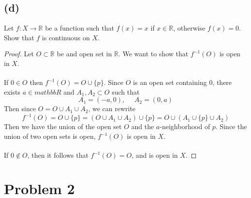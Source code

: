 \documentclass{article}
\begin{document}
\subsection*{(d)}
Let $f: X \rightarrow \mathbb{R}$ be a function such that $f(x) = x$ if $x \in \mathbb{R}$, otherwise $f(x) = 0$.
Show that $f$ is continuous on $X$.
\begin{proof}
    Let $O \subset \mathbb{R}$ be and open set in $\mathbb{R}$.
    We want to show that $f^{-1}(O)$ is open in $X$.
    \\\\
     If $0 \in O$ then $f^{-1}(O) = O \cup \{p\}$.
    Since $O$ is an open set containing $0$, there exists $a \in mathbb{R}$ and $A_1, A_2 \subset O$ such that 
    \[
        A_1 = (-a, 0), \ \ \ \ \ \ A_2 = (0, a)
    \]
    Then since $O= O \cup A_1 \cup A_2$, we can rewrite 
    \[f^{-1}(O) = O \cup \{p\} = (O \cup A_1 \cup A_2) \cup \{p\} = O \cup (A_1 \cup \{p\} \cup A_2)\]
    Then we have the union of the open set $O$ and the $a$-neighborhood of $p$.
    Since the union of two open sets is open, $f^{-1}(O)$ is open in $X$.
    \\\\
     If $0 \notin O$, then it follows that $f^{-1}(O) = O$, and is open in $X$.
\end{proof}
\section*{Problem 2}
\end{document}
